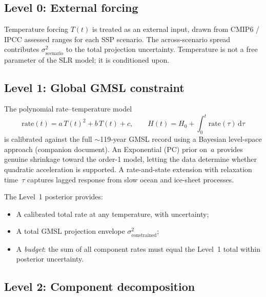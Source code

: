 \documentclass[11pt]{article}
\begin{document}
\subsection{Level 0: External forcing}

Temperature forcing $T(t)$ is treated as an external input, drawn from CMIP6 / IPCC assessed ranges for each SSP scenario.  The across-scenario spread contributes $\sigma_{\text{scenario}}^2$ to the total projection uncertainty.  Temperature is not a free parameter of the SLR model; it is conditioned upon.

\subsection{Level 1: Global GMSL constraint}

The polynomial rate--temperature model
\begin{equation}
  \text{rate}(t) = a\,T(t)^2 + b\,T(t) + c, \qquad
  H(t) = H_0 + \int_0^t \text{rate}(\tau)\,\mathrm{d}\tau
  \label{eq:rate-model}
\end{equation}
is calibrated against the full $\sim$119-year GMSL record using a Bayesian level-space approach (companion document).  An Exponential (PC) prior on~$a$ provides genuine shrinkage toward the order-1 model, letting the data determine whether quadratic acceleration is supported.  A rate-and-state extension with relaxation time~$\tau$ captures lagged response from slow ocean and ice-sheet processes.

The Level~1 posterior provides:
\begin{itemize}
  \item A calibrated total rate at any temperature, with uncertainty;
  \item A total GMSL projection envelope $\sigma_{\text{constrained}}^2$;
  \item A \emph{budget}: the sum of all component rates must equal the Level~1 total within posterior uncertainty.
\end{itemize}

\subsection{Level 2: Component decomposition}
\end{document}
